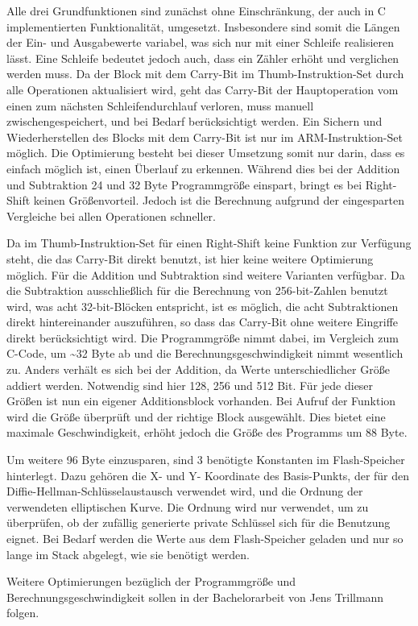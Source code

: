 Alle drei Grundfunktionen sind zunächst ohne Einschränkung, der auch in C implementierten Funktionalität, umgesetzt. Insbesondere sind somit
die Längen der Ein- und Ausgabewerte variabel, was sich nur mit einer Schleife realisieren lässt. Eine Schleife bedeutet jedoch auch, dass
ein Zähler erhöht und verglichen werden muss. Da der Block mit dem Carry-Bit im Thumb-Instruktion-Set durch alle Operationen aktualisiert wird,
geht das Carry-Bit der Hauptoperation vom einen zum nächsten Schleifendurchlauf verloren, muss manuell zwischengespeichert, und bei Bedarf
berücksichtigt werden. Ein Sichern und Wiederherstellen des Blocks mit dem Carry-Bit ist nur im ARM-Instruktion-Set möglich.
Die Optimierung besteht bei dieser Umsetzung somit nur darin, dass es einfach möglich ist, einen Überlauf zu erkennen.
Während dies bei der Addition und Subtraktion 24 und 32 Byte Programmgröße einspart, bringt es bei Right-Shift
keinen Größenvorteil. Jedoch ist die Berechnung aufgrund der eingesparten Vergleiche bei allen Operationen schneller.

Da im Thumb-Instruktion-Set für einen Right-Shift keine Funktion zur Verfügung steht, die das Carry-Bit direkt benutzt, ist hier keine weitere Optimierung möglich.
Für die Addition und Subtraktion sind weitere Varianten verfügbar. Da die Subtraktion ausschließlich für die Berechnung von 256-bit-Zahlen benutzt wird,
was acht 32-bit-Blöcken entspricht, ist es möglich, die acht Subtraktionen direkt hintereinander auszuführen, so dass das Carry-Bit ohne weitere
Eingriffe direkt berücksichtigt wird. Die Programmgröße nimmt dabei, im Vergleich zum C-Code, um \textasciitilde 32 Byte ab und die
Berechnungsgeschwindigkeit nimmt wesentlich zu. Anders verhält es sich bei der Addition, da Werte unterschiedlicher Größe addiert werden.
Notwendig sind hier 128, 256 und 512 Bit. Für jede dieser Größen ist nun ein eigener Additionsblock vorhanden. Bei Aufruf der Funktion wird
die Größe überprüft und der richtige Block ausgewählt. Dies bietet eine maximale Geschwindigkeit, erhöht jedoch die Größe des Programms um 88 Byte.

Um weitere 96 Byte einzusparen, sind 3 benötigte Konstanten im Flash-Speicher hinterlegt. Dazu gehören die X- und Y- Koordinate des Basis-Punkts, der für
den Diffie-Hellman-Schlüsselaustausch verwendet wird, und die Ordnung der verwendeten elliptischen Kurve. Die Ordnung wird nur verwendet, um zu überprüfen,
ob der zufällig generierte private Schlüssel sich für die Benutzung eignet. Bei Bedarf werden die Werte aus dem Flash-Speicher geladen und nur so lange
im Stack abgelegt, wie sie benötigt werden.

Weitere Optimierungen bezüglich der Programmgröße und Berechnungsgeschwindigkeit sollen in der Bachelorarbeit von Jens Trillmann folgen.